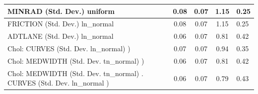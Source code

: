 \begin{table}
\begin{center}
\begin{tabular}{|l|l|c|c|c|l|}
			\hline
			MINRAD (Std. Dev.) uniform &  & 0.08 & 0.07 & 1.15 & 0.25 \\
			\hline
			FRICTION (Std. Dev.) ln_normal &  & 0.08 & 0.07 & 1.15 & 0.25 \\
			\hline
			ADTLANE (Std. Dev.) ln_normal &  & 0.06 & 0.07 & 0.81 & 0.42 \\
			\hline
			 Chol: CURVES (Std. Dev. ln_normal) ) &  & 0.07 & 0.07 & 0.94 & 0.35 \\
			\hline
			 Chol: MEDWIDTH (Std. Dev. tn_normal) ) &  & 0.06 & 0.07 & 0.81 & 0.42 \\
			\hline
			 Chol: MEDWIDTH (Std. Dev. tn_normal) . CURVES (Std. Dev.   ln_normal ) &  & 0.06 & 0.07 & 0.79 & 0.43 \\
			\hline
		\end{tabular}
	\end{center}
\end{table}